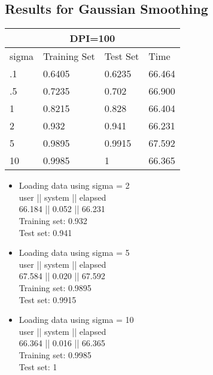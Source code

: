 \documentclass[paper=a4, fontsize=11pt]{scrartcl} %
\numberwithin{equation}{section} %
\numberwithin{figure}{section} %
\numberwithin{table}{section} %
\begin{document}
\subsection*{Results for Gaussian Smoothing}
\begin{tabular}{ |p{3cm}|p{3cm}|p{3cm}|p{3cm}|  }
 \hline
 \multicolumn{4}{|c|}{DPI=100} \\
 \hline
 sigma & Training Set & Test Set & Time\\
 \hline
 .1 & 0.6405 & 0.6235 & 66.464\\
 .5 & 0.7235 & 0.702 & 66.900\\
 1 & 0.8215 & 0.828 & 66.404\\
 2 & 0.932 & 0.941 & 66.231\\
 5 & 0.9895 & 0.9915 & 67.592\\
 10 & 0.9985 & 1 & 66.365\\
 \hline
\end{tabular}

\begin{multicols}{2}
\begin{itemize}

\item Loading data using sigma = 2 \\
   user || system || elapsed \\
 66.184 ||  0.052 || 66.231 \\
Training set: 0.932 \\
Test set: 0.941 

\item Loading data using sigma = 5 \\
   user || system || elapsed \\
 67.584 ||  0.020 || 67.592 \\
Training set: 0.9895 \\
Test set: 0.9915 

\item Loading data using sigma = 10 \\
   user || system || elapsed \\
 66.364 ||  0.016 || 66.365 \\
Training set: 0.9985 \\
Test set: 1 
 
\end{itemize}
\end{multicols}


\end{document}
